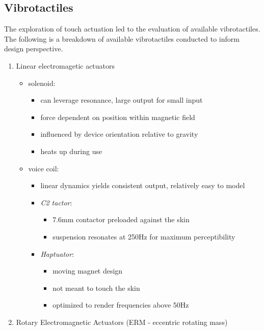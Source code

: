 \subsection{Vibrotactiles} \label{vibroTT}
The exploration of touch actuation led to the evaluation of available vibrotactiles. The following is a breakdown of available vibrotactiles conducted to inform design perspective.
\begin{enumerate}
    \item Linear electromagetic actuators
    \begin{itemize}
        \item solenoid:
        \begin{itemize}
            \item can leverage resonance, large output for small input
            \item force dependent on position within magnetic field
            \item influenced by device orientation relative to gravity
            \item heats up during use
        \end{itemize}
        \item voice coil:
        \begin{itemize}
            \item linear dynamics yields consistent output, relatively easy to model
            \item \textit{C2 tactor}:
            \begin{itemize}
                \item 7.6mm contactor preloaded against the skin
                \item suspension resonates at 250Hz for maximum perceptibility
            \end{itemize}
            \item \textit{Haptuator}:
            \begin{itemize}
                \item moving magnet design
                \item not meant to touch the skin
                \item optimized to render frequencies above 50Hz
            \end{itemize}
        \end{itemize}
    \end{itemize}
    \item Rotary Electromagnetic Actuators (ERM - eccentric rotating mass)
    \begin{itemize}

\end{itemize}
\end{enumerate}
